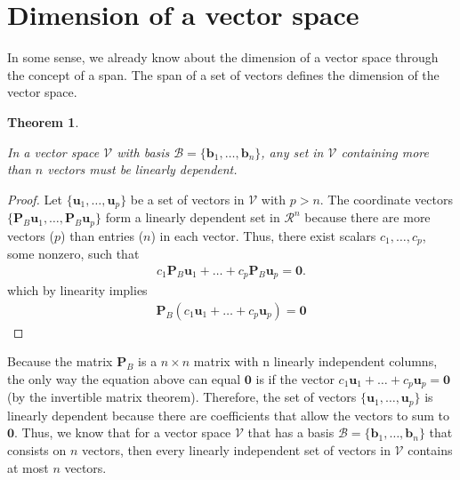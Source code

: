 \documentclass[
]{book}
\newtheorem{theorem}{Theorem}[chapter]
\theoremstyle{definition}
\theoremstyle{definition}
\theoremstyle{definition}
\theoremstyle{remark}
\begin{document}
\hypertarget{dimension-of-a-vector-space}{%
\section{Dimension of a vector space}\label{dimension-of-a-vector-space}}

In some sense, we already know about the dimension of a vector space through the concept of a span. The span of a set of vectors defines the dimension of the vector space.

\begin{theorem}
\protect\hypertarget{thm:unlabeled-div-142}{}\label{thm:unlabeled-div-142}

In a vector space \(\mathcal{V}\) with basis \(\mathcal{B} = \{ \mathbf{b}_1, \ldots, \mathbf{b}_n\}\), any set in \(\mathcal{V}\) containing more than \(n\) vectors must be linearly dependent.

\end{theorem}

\begin{proof}

Let \(\{\mathbf{u}_1, \ldots, \mathbf{u}_p \}\) be a set of vectors in \(\mathcal{V}\) with \(p > n\). The coordinate vectors \(\{\mathbf{P}_B \mathbf{u}_1, \ldots, \mathbf{P}_B \mathbf{u}_p\}\) form a linearly dependent set in \(\mathcal{R}^n\) because there are more vectors (\(p\)) than entries (\(n\)) in each vector. Thus, there exist scalars \(c_1, \ldots, c_p\), some nonzero, such that
\[
\begin{aligned}
c_1 \mathbf{P}_B \mathbf{u}_1 + \ldots + c_p \mathbf{P}_B \mathbf{u}_p = \mathbf{0}.
\end{aligned}
\]
which by linearity implies
\[
\begin{aligned}
\mathbf{P}_B (c_1 \mathbf{u}_1 + \ldots + c_p \mathbf{u}_p) = \mathbf{0} 
\end{aligned}
\]

\end{proof}

Because the matrix \(\mathbf{P}_{B}\) is a \(n \times n\) matrix with n linearly independent columns, the only way the equation above can equal \(\mathbf{0}\) is if the vector \(c_1 \mathbf{u}_1 + \ldots + c_p \mathbf{u}_p = \mathbf{0}\) (by the invertible matrix theorem). Therefore, the set of vectors \(\{\mathbf{u}_1, \ldots, \mathbf{u}_p \}\) is linearly dependent because there are coefficients that allow the vectors to sum to \(\mathbf{0}\). Thus, we know that for a vector space \(\mathcal{V}\) that has a basis \({\mathcal{B} = \{ \mathbf{b}_1, \ldots, \mathbf{b}_n \}}\) that consists on \(n\) vectors, then every linearly independent set of vectors in \(\mathcal{V}\) contains at most \(n\) vectors.
\end{document}
